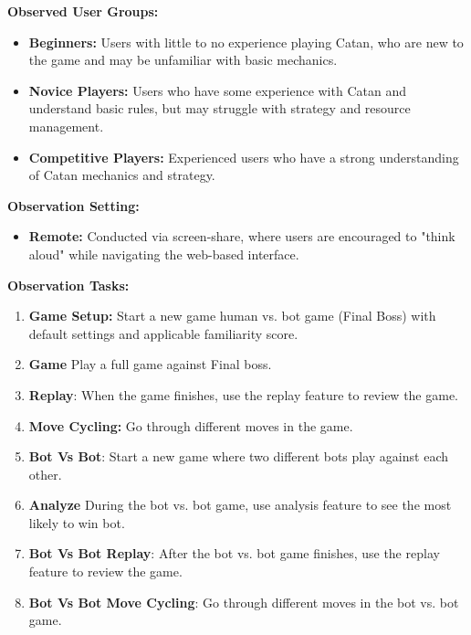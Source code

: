 \documentclass[12pt]{article}
\begin{document}
\textbf{Observed User Groups:}
\begin{itemize}
    \item \textbf{Beginners:} Users with little to no experience playing Catan, who are new to the game and may be unfamiliar with basic mechanics.
    \item \textbf{Novice Players:} Users who have some experience with Catan and understand basic rules, but may struggle with strategy and resource management.
    \item \textbf{Competitive Players:} Experienced users who have a strong understanding of Catan mechanics and strategy.
\end{itemize}

\textbf{Observation Setting:}
\begin{itemize}
    \item \textbf{Remote:} Conducted via screen-share, where users are encouraged to "think aloud" while navigating the web-based interface.
\end{itemize}

\textbf{Observation Tasks:}
\begin{enumerate}
    \item \textbf{Game Setup:} Start a new game human vs. bot game (Final Boss) with default settings and applicable familiarity score.
    \item \textbf{Game} Play a full game against Final boss.
    \item \textbf{Replay}: When the game finishes, use the replay feature to review the game.
    \item \textbf{Move Cycling:} Go through different moves in the game.
    \item \textbf{Bot Vs Bot}: Start a new game where two different bots play against each other.
    \item \textbf{Analyze} During the bot vs. bot game, use analysis feature to see the most likely to win bot.
    \item \textbf{Bot Vs Bot Replay}: After the bot vs. bot game finishes, use the replay feature to review the game.
    \item \textbf{Bot Vs Bot Move Cycling}: Go through different moves in the bot vs. bot game.
\end{enumerate}
\end{document}
